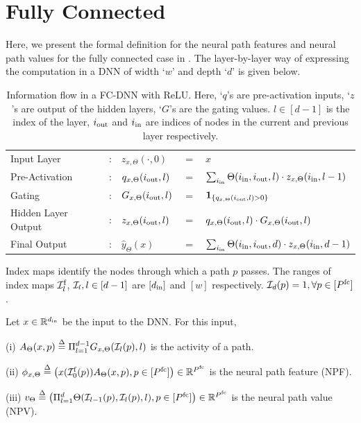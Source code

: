 \section{Fully Connected}
Here, we present the formal definition for the neural path features and neural path values for the fully connected case in .  The layer-by-layer way of expressing the computation in a DNN of width `$w$' and depth `$d$' is given below.
\begin{table}[h]
\centering
\begin{tabular}{| ll lll|}\hline
 Input Layer &:& $z_{x,\Theta}(\cdot,0)$ &$=$ &$x$ \\
Pre-Activation&:& $q_{x,\Theta}(i_{\text{out}},l)$& $=$ & $\sum_{i_{\text{in}}}\Theta(i_{\text{in}},i_{\text{out}},l) \cdot z_{x,\Theta}(i_{\text{in}},l-1) $\\
Gating&:& $G_{x,\Theta}(i_{\text{out}},l)$& $=$ & $\mathbf{1}_{\{q_{x,\Theta}(i_{\text{out}},l)>0\}}$\\
Hidden Layer Output &:&$z_{x,\Theta}(i_{\text{out}},l)$ & $=$ & $q_{x,\Theta}(i_{\text{out}},l)\cdot G_{x,\Theta}(i_{\text{out}},l)$\\
Final Output &:&$\hat{y}_{\Theta}(x)$ & $=$ & $\sum_{i_{\text{in}}}\Theta(i_{\text{in}},i_{\text{out}}, d)\cdot z_{x,\Theta}(i_{\text{in}},d-1)$\\\hline
\end{tabular}
\caption{\small{Information flow in a FC-DNN with ReLU. Here, `$q$'s are pre-activation inputs, `$z$'s are output of the hidden layers, `$G$'s are the gating values. $l\in[d-1]$ is the index of the layer, $i_{\text{out}}$ and $i_{\text{in}}$ are indices of  nodes in the current and previous layer respectively.}}
\label{tb:basic}
\end{table}

\begin{notation}
Index maps identify the nodes through which a path $p$ passes. The ranges of index maps $\mathcal{I}^{\text{f}}_l$, $\mathcal{I}_l,l\in[d-1]$ are $[d_{\text{in}}]$ and $[w]$ respectively.  $\mathcal{I}_d(p)=1,\forall p\in[P^{\text{fc}}]$.
\end{notation}

\begin{definition}\label{def:formal-npf-npv} Let $x\in\mathbb{R}^{d_{\text{in}}}$ be the input to the DNN. For this input, 

(i)  $A_{\Theta}(x,p)\stackrel{\Delta}{=}\Pi_{l=1}^{d-1} G_{x,\Theta}(\mathcal{I}_l(p),l)$ is the activity of a path.

(ii)  $\phi_{x,\Theta}\stackrel{\Delta}{=} \left( x(\mathcal{I}^{\text{f}}_0(p))A_{\Theta}(x,p), p\in[P^{\text{fc}}]\right)\in\mathbb{R}^{P^{\text{fc}}}$ is the {neural path feature} (NPF).

(iii)  $v_{\Theta}\stackrel{\Delta}{=} \left( \Pi_{l=1}^d \Theta(\mathcal{I}_{l-1}(p),\mathcal{I}_l(p),l), p\in[P^{\text{fc}}]\right)\in\mathbb{R}^{P^{\text{fc}}}$ is the {neural path value} (NPV).
\end{definition}

